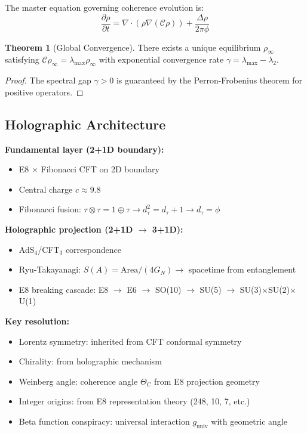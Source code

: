 \documentclass[11pt]{article}
\theoremstyle{definition}
\newtheorem{theorem}{Theorem}[section]
\newcommand{\goldenratio}{\phi}
\newcommand{\coherence}{\mathcal{C}}
\newcommand{\density}{\rho}
\newcommand{\fibonacci}{\tau}
\newcommand{\eigenvalue}{\lambda}
\begin{document}
The master equation governing coherence evolution is:
\begin{equation}
\frac{\partial \density}{\partial t} = \nabla \cdot (\density \nabla (\coherence\density)) + \frac{\Delta \density}{2\pi\goldenratio}
\end{equation}

\begin{theorem}[Global Convergence]
There exists a unique equilibrium $\density_\infty$ satisfying $\coherence\density_\infty = \eigenvalue_{\max} \density_\infty$ with exponential convergence rate $\gamma = \eigenvalue_{\max} - \eigenvalue_2$.
\end{theorem}

\begin{proof}
The spectral gap $\gamma > 0$ is guaranteed by the Perron-Frobenius theorem for positive operators.
\end{proof}

\subsection{Holographic Architecture}

\textbf{Fundamental layer (2+1D boundary):}
\begin{itemize}
\item E8 $\times$ Fibonacci CFT on 2D boundary
\item Central charge $c \approx 9.8$
\item Fibonacci fusion: $\fibonacci \otimes \fibonacci = 1 \oplus \fibonacci \to d_\fibonacci^2 = d_\fibonacci + 1 \to d_\fibonacci = \goldenratio$
\end{itemize}

\textbf{Holographic projection (2+1D $\to$ 3+1D):}
\begin{itemize}
\item AdS$_4$/CFT$_3$ correspondence
\item Ryu-Takayanagi: $S(A) = \text{Area}/(4G_N) \to$ spacetime from entanglement
\item E8 breaking cascade: E8 $\to$ E6 $\to$ SO(10) $\to$ SU(5) $\to$ SU(3)$\times$SU(2)$\times$U(1)
\end{itemize}

\textbf{Key resolution:}
\begin{itemize}
\item Lorentz symmetry: inherited from CFT conformal symmetry
\item Chirality: from holographic mechanism
\item Weinberg angle: coherence angle $\Theta_C$ from E8 projection geometry
\item Integer origins: from E8 representation theory (248, 10, 7, etc.)
\item Beta function conspiracy: universal interaction $g_{\text{univ}}$ with geometric angle
\end{itemize}
\end{document}
